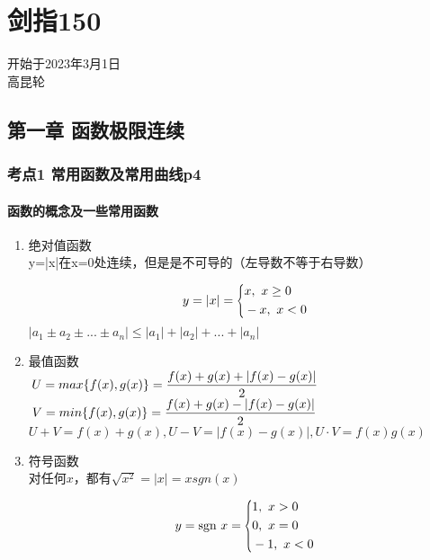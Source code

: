 \chapter{剑指150}
开始于2023年3月1日\\高昆轮
\section{第一章 函数极限连续}
\subsection{考点1 常用函数及常用曲线p4}
\subsubsection{函数的概念及一些常用函数}
\begin{enumerate}
    \item 绝对值函数\\
    y=|x|在x=0处连续，但是是不可导的（左导数不等于右导数）\par
        \begin{equation*}
        y=|x|=
        \scaleleftright[6pt]{\biggl\{}{
        \begin{aligned}
        & x,\ x\ge 0 \\
        & -x,\ x<0
        \end{aligned}
        }{.}
        \end{equation*}
    $|a_1 \pm a_2 \pm... \pm a_n|\le|a_1|+|a_2|+...+|a_n|$

    \item 最值函数\\
    $\displaystyle\hspace{.2em} U=max\{f(x),g(x)\}= \frac{f(x)+g(x)+|f(x)-g(x)|}{2}$\\
    $\displaystyle\hspace{.2em} V=min\{f(x),g(x)\}= \frac{f(x)+g(x)-|f(x)-g(x)|}{2}$\\
    $U+V=f(x)+g(x),U-V=|f(x)-g(x)|,U \cdot V=f(x)g(x)$

    \item 符号函数\\
    对任何$x$，都有$\sqrt{x^2}=|x|=xsgn(x)$\par
    \begin{equation*}
        y=\text{sgn}\ x=
        \scaleleftright[6pt]{\biggl\{}{
            \begin{aligned}
                & 1,\ x>0 \\
                & 0,\ x=0 \\
                & -1,\ x<0
            \end{aligned}
            }{.}
        \end{equation*}
    

\end{enumerate}
